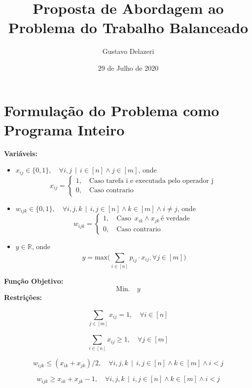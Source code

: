 \documentclass{article}
\title{Proposta de Abordagem ao Problema do Trabalho Balanceado}
\author{Gustavo Delazeri}
\date{29 de Julho de 2020}
\begin{document}
\maketitle

\section{Formulação do Problema como Programa Inteiro}
\textbf{Variáveis:} 
\begin{itemize}
  \item $x_{ij} \in \{0, 1\}, \quad \forall i,j  \, \mid  \, i \in [n] \land j \in [m]$, onde
  	$$x_{ij} = 
	\begin{cases}
	1,  \quad  \text{Caso tarefa i e executada pelo operador j } \\
	0,  \quad  \text{Caso contrario}
	\end{cases}
	$$
  \item $w_{ijk} \in \{0, 1\}, \quad \forall i,j,k  \, \mid \,  i,j \in [n]  \land k \in [m] \land i \neq j$, onde
  	$$w_{ijk} = 
	\begin{cases}
	1,  \quad  \text{Caso } \,  x_{ik} \land x_{jk} \, \text{é verdade }\\
	0,  \quad  \text{Caso contrario}
	\end{cases}
	$$
	
  \item $y \in \mathbb{R}$, onde
  	$$y = \text{max}\Bigg(\sum_{i \in [n] }^{} p_{ij} \cdot x_{ij},   \forall j \in [m] \Bigg)	$$
\end{itemize}
\textbf{Função Objetivo:} 
	$$\text{Min.} \quad y$$
\textbf{Restrições:} 

\begin{equation}
 	\sum_{j \in [m] }^{} x_{ij} = 1,   \quad \forall i \in [n] 
\end{equation}

\begin{equation}
 	\sum_{i \in [n] }^{} x_{ij}  \geq 1,  \quad  \forall j \in [m] 
\end{equation}

\begin{equation}
 	w_{ijk} \leq (x_{ik} + x_{jk})/2, \quad \forall i,j,k \, \mid \, i,j \in [n]  \land k \in [m] \land i < j
\end{equation}

\begin{equation}
 	w_{ijk} \geq x_{ik} + x_{jk} - 1,  \quad \forall i,j,k \, \mid \, i,j \in [n]  \land k \in [m] \land i < j
\end{equation}
\end{document}
